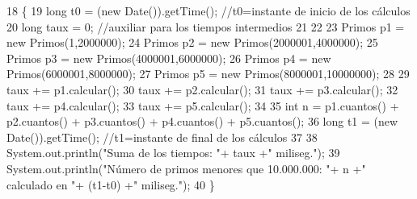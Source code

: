 \begin{DoxyCode}
18                                        \{
19            \textcolor{keywordtype}{long} t0 = (\textcolor{keyword}{new} Date()).getTime(); \textcolor{comment}{//t0=instante de inicio de los cálculos}
20            \textcolor{keywordtype}{long} taux = 0; \textcolor{comment}{//auxiliar para los tiempos intermedios}
21            
22            
23            Primos p1 = \textcolor{keyword}{new} Primos(1,2000000);
24            Primos p2 = \textcolor{keyword}{new} Primos(2000001,4000000);
25            Primos p3 = \textcolor{keyword}{new} Primos(4000001,6000000);
26            Primos p4 = \textcolor{keyword}{new} Primos(6000001,8000000);
27            Primos p5 = \textcolor{keyword}{new} Primos(8000001,10000000);
28            
29            taux += p1.calcular();
30            taux += p2.calcular();
31            taux += p3.calcular();
32            taux += p4.calcular();
33            taux += p5.calcular();
34            
35            \textcolor{keywordtype}{int} n = p1.cuantos() + p2.cuantos() + p3.cuantos() + p4.cuantos() + p5.cuantos();
36            \textcolor{keywordtype}{long} t1 = (\textcolor{keyword}{new} Date()).getTime(); \textcolor{comment}{//t1=instante de final de los cálculos}
37            
38            System.out.println(\textcolor{stringliteral}{"Suma de los tiempos: "}+ taux +\textcolor{stringliteral}{" miliseg."});
39            System.out.println(\textcolor{stringliteral}{"Número de primos menores que 10.000.000: "}+ n +\textcolor{stringliteral}{" calculado en "}+ (t1-t0) +\textcolor{stringliteral}{"
       miliseg."});
40     \}
\end{DoxyCode}
